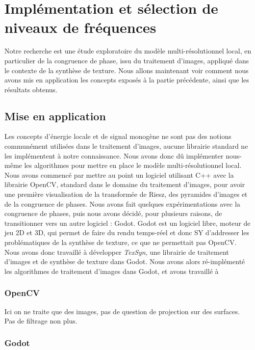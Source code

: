 \chapter{Implémentation et sélection de niveaux de fréquences}
\label{chap:chapitre2}

Notre recherche est une étude exploratoire du modèle multi-résolutionnel local, en particulier de la congruence de phase, issu du traitement d'images, appliqué dans le contexte de la synthèse de texture. Nous allons maintenant voir comment nous avons mis en application les concepts exposés à la partie précédente, ainsi que les résultats obtenus.

\section{Mise en application}

Les concepts d'énergie locale et de signal monogène ne sont pas des notions communément utilisées dans le traitement d'images, aucune librairie standard ne les implémentent à notre connaissance. Nous avons donc dû implémenter nous-même les algorithmes pour mettre en place le modèle multi-résolutionnel local. Nous avons commencé par mettre au point un logiciel utilisant C++ avec la librairie OpenCV, standard dans le domaine du traitement d'images, pour avoir une première visualisation de la transformée de Riesz, des pyramides d'images et de la congruence de phases. Nous avons fait quelques expérimentations avec la congruence de phases, puis nous avons décidé, pour plusieurs raisons, de transitionner vers un autre logiciel : Godot. Godot est un logiciel libre, moteur de jeu 2D et 3D, qui permet de faire du rendu temps-réel et donc SY d'addresser les problématiques de la synthèse de texture, ce que ne permettait pas OpenCV. Nous avons donc travaillé à développer \textit{TexSyn}, une librairie de traitement d'images et de synthèse de texture dans Godot. Nous avons alors ré-implémenté les algorithmes de traitement d'images dans Godot, et avons travaillé à

\subsection{OpenCV}

Ici on ne traite que des images, pas de question de projection sur des surfaces. Pas de filtrage non plus. 

\subsection{Godot}


